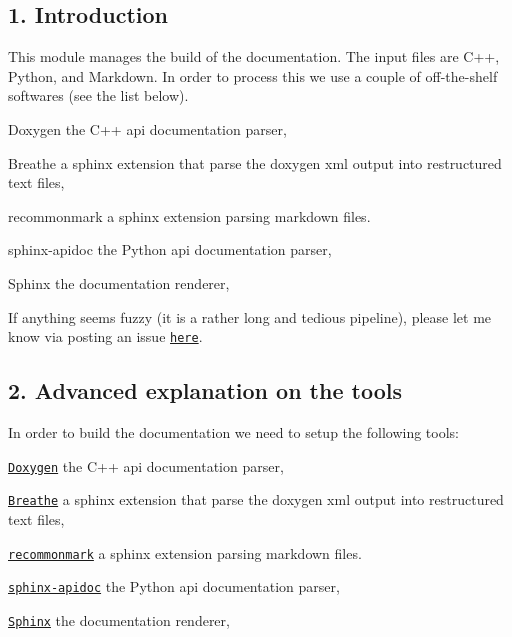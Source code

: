 \subsection*{1. Introduction}

This module manages the build of the documentation. The input files are C++, Python, and Markdown. In order to process this we use a couple of off-\/the-\/shelf softwares (see the list below).


\begin{DoxyItemize}
\item Doxygen the C++ api documentation parser,
\item Breathe a sphinx extension that parse the doxygen xml output into restructured text files,
\item recommonmark a sphinx extension parsing markdown files.
\item sphinx-\/apidoc the Python api documentation parser,
\item Sphinx the documentation renderer,
\end{DoxyItemize}

If anything seems fuzzy (it is a rather long and tedious pipeline), please let me know via posting an issue \href{https://github.com/machines-in-motion/mpi_cmake_modules/issues}{\tt here}.

\subsection*{2. Advanced explanation on the tools}

In order to build the documentation we need to setup the following tools\+:
\begin{DoxyItemize}
\item \href{http://www.doxygen.nl/}{\tt Doxygen} the C++ api documentation parser,
\item \href{https://breathe.readthedocs.io/en/latest/}{\tt Breathe} a sphinx extension that parse the doxygen xml output into restructured text files,
\item \href{https://recommonmark.readthedocs.io/en/latest/}{\tt recommonmark} a sphinx extension parsing markdown files.
\item \href{http://www.sphinx-doc.org/en/master/man/sphinx-apidoc.html}{\tt sphinx-\/apidoc} the Python api documentation parser,
\item \href{http://www.sphinx-doc.org/en/master/}{\tt Sphinx} the documentation renderer,
\end{DoxyItemize}

